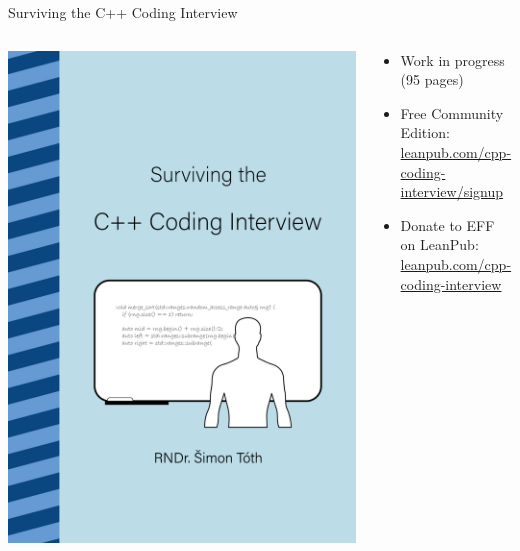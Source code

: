 \documentclass[aspectratio=169]{beamer}
\begin{document}
\begin{frame}{Surviving the C++ Coding Interview}
\begin{columns}
    \begin{column}{0.35\textwidth}
        \includegraphics[height=0.8\textheight]{static/book_interview.png}
    \end{column}
    \begin{column}{0.6\textwidth}
        \begin{itemize}
            \item Work in progress (95 pages)
            \item Free Community Edition:\\
                \href{https://leanpub.com/cpp-coding-interview/signup}{leanpub.com/cpp-coding-interview/signup}
            \item Donate to EFF on LeanPub:\\
                \href{https://leanpub.com/cpp-coding-interview}{leanpub.com/cpp-coding-interview}
        \end{itemize}
    \end{column}
\end{columns}
\end{frame}
\end{document}
